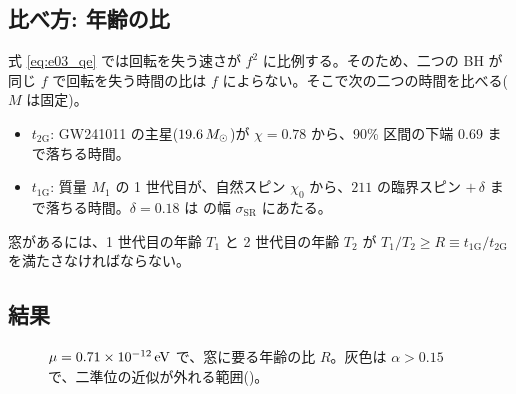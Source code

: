 \subsection{比べ方: 年齢の比}

式 \eqref{eq:e03_qe} では回転を失う速さが $f^2$ に比例する。そのため、二つの BH が同じ $f$ で回転を失う時間の比は $f$ によらない。そこで次の二つの時間を比べる($M$ は固定)。
\begin{itemize}
\item $t_\mathrm{2G}$: GW241011 の主星($19.6\,M_\odot$)が $\chi=0.78$ から、90\% 区間の下端 0.69 まで落ちる時間。
\item $t_\mathrm{1G}$: 質量 $M_1$ の 1 世代目が、自然スピン $\chi_0$ から、$211$ の臨界スピン $+\,\delta$ まで落ちる時間。$\delta=0.18$ は  の幅 $\sigma_\mathrm{SR}$ にあたる。
\end{itemize}
窓があるには、1 世代目の年齢 $T_1$ と 2 世代目の年齢 $T_2$ が $T_1/T_2\ge R\equiv t_\mathrm{1G}/t_\mathrm{2G}$ を満たさなければならない。

\subsection{結果}

\begin{figure}[H]
\centering

\caption{$\mu=0.71\times10^{-12}\,\mathrm{eV}$ で、窓に要る年齢の比 $R$。灰色は $\alpha>0.15$ で、二準位の近似が外れる範囲()。}
\label{fig:e03}
\end{figure}

